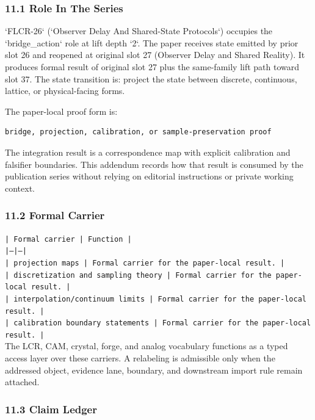 \documentclass[11pt]{article}
\begin{document}
\subsubsection*{11.1 Role In The Series}

`FLCR-26` (`Observer Delay And Shared-State Protocols`) occupies the `bridge\_action` role at lift depth `2`.
The paper receives state emitted by prior slot 26 and reopened at original slot 27 (Observer Delay and Shared Reality). It produces formal result of original slot 27 plus the same-family lift path toward slot 37. The state transition is:
project the state between discrete, continuous, lattice, or physical-facing forms.

The paper-local proof form is:

\begin{verbatim}
bridge, projection, calibration, or sample-preservation proof
\end{verbatim}

The integration result is a correspondence map with explicit calibration and falsifier boundaries. This addendum records how that result is
consumed by the publication series without relying on editorial instructions or
private working context.

\subsubsection*{11.2 Formal Carrier}

\noindent\texttt{| Formal carrier | Function |}\\
\noindent\texttt{|---|---|}\\
\noindent\texttt{| projection maps | Formal carrier for the paper-local result. |}\\
\noindent\texttt{| discretization and sampling theory | Formal carrier for the paper-local result. |}\\
\noindent\texttt{| interpolation/continuum limits | Formal carrier for the paper-local result. |}\\
\noindent\texttt{| calibration boundary statements | Formal carrier for the paper-local result. |}\\

The LCR, CAM, crystal, forge, and analog vocabulary functions as a typed access
layer over these carriers. A relabeling is admissible only when the addressed
object, evidence lane, boundary, and downstream import rule remain attached.

\subsubsection*{11.3 Claim Ledger}
\end{document}
